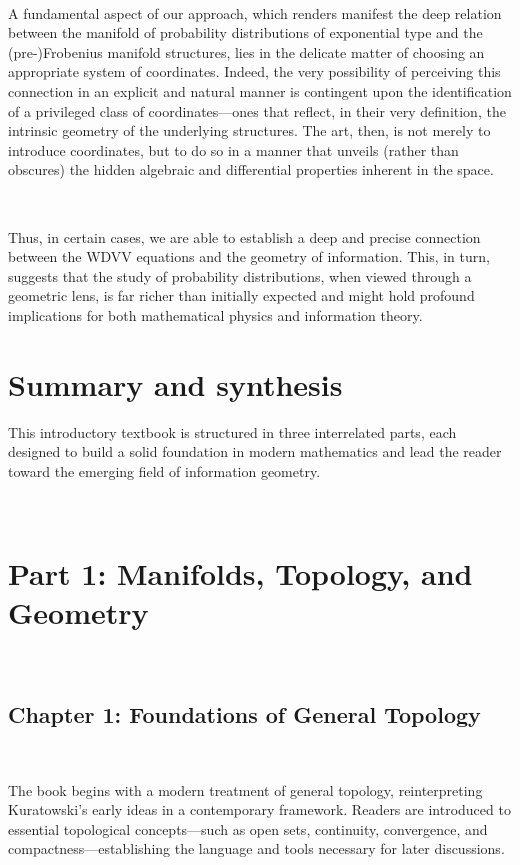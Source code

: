 \,

A fundamental aspect of our approach, which renders manifest the deep relation between the manifold of probability distributions of exponential type and the (pre-)Frobenius manifold structures, lies in the delicate matter of choosing an appropriate system of coordinates. Indeed, the very possibility of perceiving this connection in an explicit and natural manner is contingent upon the identification of a privileged class of coordinates—ones that reflect, in their very definition, the intrinsic geometry of the underlying structures. The art, then, is not merely to introduce coordinates, but to do so in a manner that unveils (rather than obscures) the hidden algebraic and differential properties inherent in the space.  

\,

Thus, in certain cases, we are able to establish a deep and precise connection between the WDVV equations and the geometry of information. This, in turn, suggests that the study of probability distributions, when viewed through a geometric lens, is far richer than initially expected and might hold profound implications for both mathematical physics and information theory.  

\section{Summary and synthesis}
This introductory textbook is structured in three interrelated parts, each designed to build a solid foundation in modern mathematics and lead the reader toward the emerging field of information geometry.

\, 

\section*{\bf Part 1: Manifolds, Topology, and Geometry}
\, 

\subsection*{\bf Chapter 1: Foundations of General Topology}
\,

The book begins with a modern treatment of general topology, reinterpreting Kuratowski’s early ideas \cite{Ku72} in a contemporary framework. Readers are introduced to essential topological concepts—such as open sets, continuity, convergence, and compactness—establishing the language and tools necessary for later discussions.

